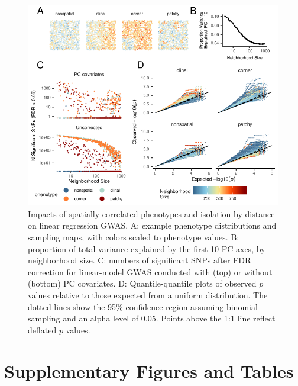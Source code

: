 \documentclass[9pt,twocolumn,twoside,lineno]{gsajnl}
\begin{document}
\afterpage{\clearpage}
\begin{figure}[p]
\centering
\includegraphics[width=\textwidth]{gwas_summary_nsig_qqplots_loglog.pdf}
\caption{Impacts of spatially correlated phenotypes and isolation by distance on linear regression GWAS.  A: example phenotype distributions and sampling maps, with colors scaled to phenotype values. B: proportion of total variance explained by the first 10 PC axes, by neighborhood size. C: numbers of significant SNPs after FDR correction for linear-model GWAS conducted with (top) or without (bottom) PC covariates. D: Quantile-quantile plots of observed $p$ values relative to those expected from a uniform distribution. The dotted lines show the 95\% confidence region assuming binomial sampling and an alpha level of 0.05. Points above the 1:1 line reflect deflated $p$ values.}
\label{fig:spectrum}
\end{figure}

\afterpage{\clearpage}



\section{Supplementary Figures and Tables}
\beginsupplement
\end{document}
